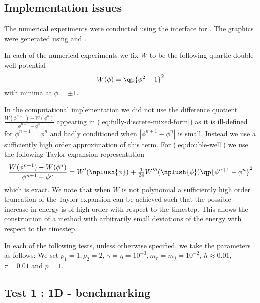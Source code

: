 \documentclass[final]{amsart}
\numberwithin{equation}{section}
\begin{document}
\subsection{Implementation issues}

The numerical experiments were conducted using the \dolfin interface
for \fenics \cite{LoggWells:2010}. The graphics were generated using
\gnuplot and \paraview.

In each of the numerical experiments we fix $W$ to be the following
quartic double well potential
\begin{equation}
  \label{eq:double-well}
  W(\phi) = \qp{\phi^2 - 1}^2
\end{equation}
with minima at $\phi = \pm 1$.

\begin{Rem}
  In the computational implementation we did not use the difference
  quotient $\tfrac{W(\phi^{n+1})-W(\phi^n)}{\phi^{n+1} - \phi^n}$
  appearing in (\ref{eq:fully-discrete-mixed-form}) as it is ill-defined for
  $\phi^{n+1} = \phi^n$ and badly conditioned when $|\phi^{n+1} -
  \phi^n|$ is small. Instead we use a sufficiently high order
  approximation of this term. For (\ref{eq:double-well}) we use the
  following Taylor expansion representation
  \begin{equation}
    \frac{W(\phi^{n+1})-W(\phi^n)}{\phi^{n+1} - \phi^n}
    =
    W'(\nplush{\phi})
    +
    \tfrac{1}{24}W'''(\nplush{\phi})\qp{\phi^{n+1} - \phi^{n}}^2
  \end{equation}
  which is exact. We note that when $W$ is not polynomial a
  sufficiently high order truncation of the Taylor expansion can be
  achieved such that the possible increase in energy is of high order with
  respect to the timestep. This allows the
  construction of a method with arbitrarily small deviations of the
  energy with respect to the timestep.
\end{Rem}

\begin{Rem}
  In each of the following tests, unless otherwise specified, we take
  the parameters as follows: We set $\rho_1 = 1, \rho_2 = 2$, $\gamma
  = \eta = 10^{-3}, m_r = m_j = 10^{-2}$, $h \approx 0.01$, $\tau =
  0.01$ and $p=1$.
\end{Rem}

\subsection{Test 1 : 1D - benchmarking}
\end{document}
